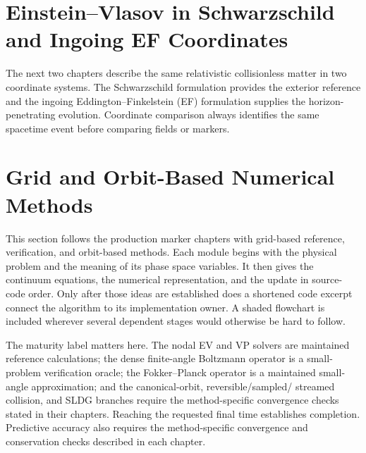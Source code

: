\documentclass[11pt]{article}
\newif\ifvenusfullcpu
\begin{document}




\section{Einstein--Vlasov in Schwarzschild and Ingoing EF Coordinates}

The next two chapters describe the same relativistic collisionless matter in
two coordinate systems.  The Schwarzschild formulation provides the exterior
reference and the ingoing Eddington--Finkelstein (EF) formulation supplies the
horizon-penetrating evolution.  Coordinate comparison always identifies the
same spacetime event before comparing fields or markers.

\ifvenusfullcpu



\fi





\section{Grid and Orbit-Based Numerical Methods}

This section follows the production marker chapters with grid-based reference,
verification, and orbit-based methods.  Each module begins with the physical
problem and the meaning of its phase space variables.  It then gives the
continuum equations, the numerical representation, and the update in source-
code order.  Only after those ideas are established does a shortened code
excerpt connect the algorithm to its implementation owner.  A shaded
flowchart is included wherever several dependent stages would otherwise be
hard to follow.

The maturity label matters here.  The nodal EV and VP solvers are maintained
reference calculations; the dense finite-angle Boltzmann operator is a small-
problem verification oracle; the Fokker--Planck operator is a maintained
small-angle approximation; and the canonical-orbit, reversible/sampled/
streamed collision, and SLDG branches require the method-specific convergence checks
stated in their chapters.  Reaching the requested final time establishes completion. Predictive
accuracy also requires the method-specific convergence and conservation
checks described in each chapter.
\end{document}
